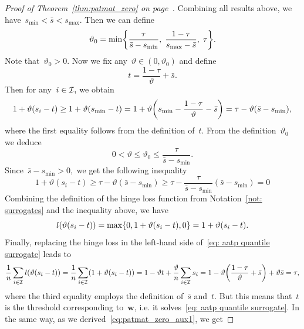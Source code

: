 \begin{proof}[Proof of Theorem~\ref{thm:patmat_zero} on page~\pageref{thm:patmat_zero}]
  Combining all results above, we have~$s_{\min} < \bar{s} < s_{\max}$. Then we can define
  \begin{equation*}
    \vartheta_0 = \min\Brac[c]{\frac{\tau}{\bar{s} - s_{\min}}, \; \frac{1-\tau}{s_{\max}-\bar{s}}, \; \tau}.
  \end{equation*}
  Note that~$\vartheta_0 > 0.$ Now we fix any~$\vartheta \in (0, \vartheta_0)$ and define
  \begin{equation*}
    t = \frac{1 - \tau}{\vartheta} + \bar{s}.
  \end{equation*}
  Then for any~$i \in \mathcal{I},$ we obtain 
  \begin{equation*}
    1 + \vartheta(s_i - t)
      \geq 1 + \vartheta(s_{\min} - t)
      = 1 + \vartheta \Brac{s_{\min} - \frac{1 - \tau}{\vartheta} - \bar{s}}
      = \tau - \vartheta (\bar{s} - s_{\min}),
  \end{equation*}
  where the first equality follows from the definition of~$t.$ From the definition~$\vartheta_0$ we deduce
  \begin{equation*}
    0 < \vartheta \leq \vartheta_0 \leq \frac{\tau}{\bar{s} - s_{\min}}.
  \end{equation*}
  Since~$\bar{s} - s_{\min} > 0,$ we get the following inequality
  \begin{equation}\label{eq:patmat_zero_aux1}
    1 + \vartheta(s_i - t)
      \geq \tau - \vartheta (\bar{s} - s_{\min})
      \geq \tau - \frac{\tau}{\bar{s} - s_{\min}} (\bar{s} - s_{\min})
      = 0
  \end{equation}
  Combining the definition of the hinge loss function from Notation~\ref{not: surrogates} and the inequality above, we have
  \begin{equation*}
    l\Brac{\vartheta (s_i - t)}
      = \max\{0, 1 + \vartheta (s_i - t), 0\}
      = 1 + \vartheta(s_i - t).
  \end{equation*}
  Finally, replacing the hinge loss in the left-hand side of~\eqref{eq: aatp quantile surrogate} leads to
  \begin{equation*}
    \frac{1}{\nall} \sum_{i \in \I} l\Brac{\vartheta (s_i - t)}
      = \frac{1}{\nall}\sum_{i \in \I}\Brac{1 + \vartheta(s_i - t)}
      = 1 - \vartheta t + \frac{\vartheta}{n} \sum_{i \in \I} s_i
      = 1 - \vartheta \Brac{\frac{1 - \tau}{\vartheta} + \bar{s}} + \vartheta \bar{s}
      = \tau,
  \end{equation*}
  where the third equality employs the definition of~$\bar{s}$ and~$t$. But this means that~$t$ is the threshold corresponding to~$\bm{w}$, i.e. it solves~\eqref{eq: aatp quantile surrogate}. In the same way, as we derived~\eqref{eq:patmat_zero_aux1}, we get

\end{proof}

